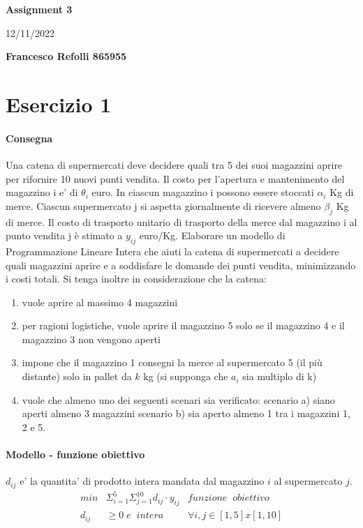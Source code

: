 \documentclass[a4paper,12pt,oneside]{article}
\begin{document}
\thispagestyle{plain}
\begin{center}
  \normalsize
  \textbf{Assignment 3}
  
  \vspace{0.2cm}
  \normalsize
  12/11/2022
  
  \vspace{0.2cm}
  \textbf{Francesco Refolli 865955}
\end{center}

\section{Esercizio 1}

\paragraph{Consegna}

Una catena di supermercati deve decidere quali tra 5 dei suoi magazzini aprire per rifornire 10 nuovi punti vendita. Il costo per l’apertura e mantenimento del magazzino i e' di $\theta_i$ euro. In ciascun magazzino i possono essere stoccati $\alpha_i$ Kg di merce. Ciascun supermercato j si aspetta giornalmente di ricevere almeno $\beta_j$ Kg di merce. Il costo di trasporto unitario di trasporto della merce dal magazzino i al punto vendita j è stimato a $y_{ij}$ euro/Kg. Elaborare un modello di Programmazione Lineare Intera che aiuti la catena di supermercati a decidere quali magazzini aprire e a soddisfare le domande dei punti vendita, minimizzando i costi totali.
Si tenga inoltre in considerazione che la catena:
\begin{enumerate}
\item vuole aprire al massimo 4 magazzini
\item per ragioni logistiche, vuole aprire il magazzino 5 solo se il magazzino 4 e il magazzino 3 non vengono aperti
\item impone che il magazzino 1 consegni la merce al supermercato 5 (il più distante) solo in pallet da $k$ kg (si supponga che $a_i$ sia multiplo di k)
\item vuole che almeno uno dei seguenti scenari sia verificato: scenario a) siano aperti almeno 3 magazzini scenario b) sia aperto almeno 1 tra i magazzini 1, 2 e 5.
\end{enumerate}

\paragraph{Modello - funzione obiettivo}
$d_{ij}$ e' la quantita' di prodotto intera mandata dal magazzino $i$ al supermercato $j$.
\begin{align*}
  min & \Sigma ^ {5} _ {i=1} \Sigma ^ {10} _ {j=1} d_{ij} \cdot y_{ij} & funzione \;\; obiettivo \\
  d_{ij} &\geq 0 \; e \;\; intera & \forall i,j \in [1,5] x [1,10]
\end{align*}
\end{document}
